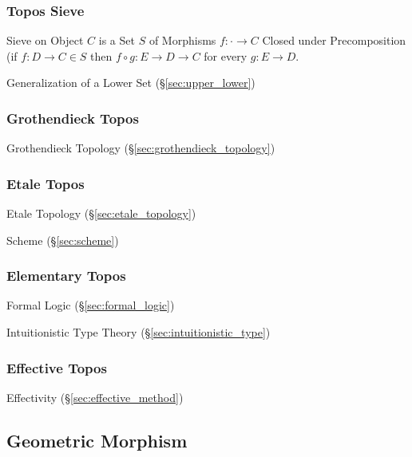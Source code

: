 \subsubsection{Topos Sieve}\label{sec:topos_sieve}

Sieve on Object $C$ is a Set $S$ of Morphisms $f : \cdot \rightarrow
C$ Closed under Precomposition (if $f : D \rightarrow C \in S$ then $f
\circ g : E \rightarrow D \rightarrow C$ for every $g : E \rightarrow
D$.

Generalization of a Lower Set (\S\ref{sec:upper_lower})



\subsubsection{Grothendieck Topos}\label{sec:grothendieck_topos}

Grothendieck Topology (\S\ref{sec:grothendieck_topology})



\subsubsection{Etale Topos}\label{sec:etale_topos}

Etale Topology (\S\ref{sec:etale_topology})

Scheme (\S\ref{sec:scheme})



\subsubsection{Elementary Topos}\label{sec:elementary_topos}

Formal Logic (\S\ref{sec:formal_logic})

Intuitionistic Type Theory (\S\ref{sec:intuitionistic_type})



\subsubsection{Effective Topos}\label{sec:effective_topos}

Effectivity (\S\ref{sec:effective_method})



\subsection{Geometric Morphism}\label{sec:geometric_morphism}



